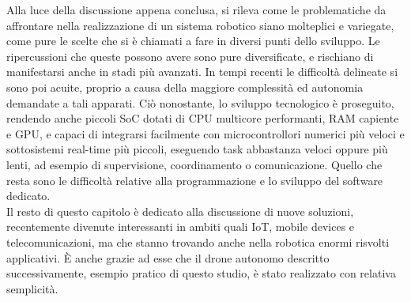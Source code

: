 \indent Alla luce della discussione appena conclusa, si rileva come le problematiche da affrontare nella realizzazione di un sistema robotico siano molteplici e variegate, come pure le scelte che si è chiamati a fare in diversi punti dello sviluppo. Le ripercussioni che queste possono avere sono pure diversificate, e rischiano di manifestarsi anche in stadi più avanzati. In tempi recenti le difficoltà delineate si sono poi acuite, proprio a causa della maggiore complessità ed autonomia demandate a tali apparati. Ciò nonostante, lo sviluppo tecnologico è proseguito, rendendo anche piccoli SoC dotati di CPU multicore performanti, RAM capiente e GPU, e capaci di integrarsi facilmente con microcontrollori numerici più veloci e sottosistemi real-time più piccoli, eseguendo task abbastanza veloci oppure più lenti, ad esempio di supervisione, coordinamento o comunicazione. Quello che resta sono le difficoltà relative alla programmazione e lo sviluppo del software dedicato.\\
Il resto di questo capitolo è dedicato alla discussione di nuove soluzioni, recentemente divenute interessanti in ambiti quali IoT, mobile devices e telecomunicazioni, ma che stanno trovando anche nella robotica enormi risvolti applicativi. È anche grazie ad esse che il drone autonomo descritto successivamente, esempio pratico di questo studio, è stato realizzato con relativa semplicità.

